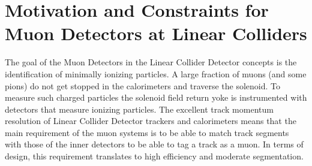 \section{Motivation and Constraints for Muon Detectors at Linear Colliders}

The goal of the Muon Detectors in the Linear Collider Detector concepts is the identification of minimally ionizing particles. A large fraction of muons (and some pions) do not get stopped in the calorimeters and traverse the solenoid. To measure such charged particles the solenoid field return yoke is instrumented with detectors that measure ionizing particles. The excellent track momentum resolution of Linear Collider Detector trackers and calorimeters means that the main requirement of the muon systems is to be able to match track segments with those of the inner detectors to be able to tag a track as a muon. In terms of design, this requirement translates to high efficiency and moderate segmentation.
